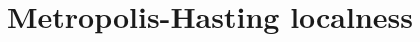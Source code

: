 \documentclass[xetex]{beamer}
\begin{document}



	


	\section[localness]{Metropolis-Hasting localness}
		
	


%		


\end{document}
